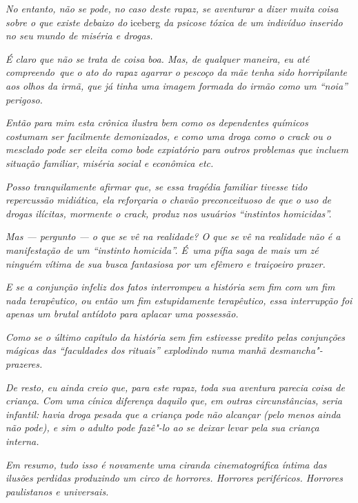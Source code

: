 \emph{No entanto, não se pode, no caso deste rapaz, se aventurar a dizer
muita coisa sobre o que existe debaixo do} iceberg \emph{da psicose tóxica de
um indivíduo inserido no seu mundo de miséria e drogas.}

\emph{É claro que não se trata de coisa boa. Mas, de qualquer maneira,
eu até compreendo~que o ato do rapaz agarrar o pescoço da mãe tenha sido
horripilante aos olhos da irmã, que já tinha uma imagem formada do irmão
como um ``noia'' perigoso.}

\emph{Então para mim esta crônica ilustra bem como os dependentes
químicos costumam ser facilmente demonizados, e como uma droga como o
crack ou o mesclado pode ser eleita como bode expiatório para outros
problemas que incluem situação familiar, miséria social e econômica
etc.}

\emph{Posso tranquilamente afirmar que, se essa tragédia familiar
tivesse tido repercussão midiática, ela reforçaria o chavão
preconceituoso de que o uso de drogas ilícitas, mormente o crack, produz
nos usuários ``instintos homicidas''.}

\emph{Mas --- pergunto --- o que se vê na realidade? O que se vê na
realidade não é a manifestação de um ``instinto homicida''. É~uma pífia
saga de mais um zé ninguém vítima de sua busca fantasiosa por um efêmero
e traiçoeiro prazer.}

\emph{E se a conjunção infeliz dos fatos interrompeu a história sem fim
com um fim nada terapêutico, ou então um fim estupidamente terapêutico,
essa interrupção foi apenas um brutal antídoto para aplacar uma
possessão.}

\emph{Como se o último capítulo da história sem fim estivesse predito
pelas conjunções mágicas das ``faculdades dos rituais'' explodindo numa
manhã desmancha"-prazeres.}

\emph{De resto, eu ainda creio que, para este rapaz, toda sua aventura
parecia coisa de criança. Com uma cínica diferença daquilo que, em
outras circunstâncias, seria infantil: havia droga pesada que a criança
pode não alcançar (pelo menos ainda não pode), e sim o adulto pode
fazê"-lo ao se deixar levar pela sua criança interna.}

\emph{Em resumo, tudo isso é novamente uma ciranda cinematográfica
íntima das ilusões perdidas produzindo um circo de horrores. Horrores
periféricos. Horrores paulistanos e universais.}
\endgroup